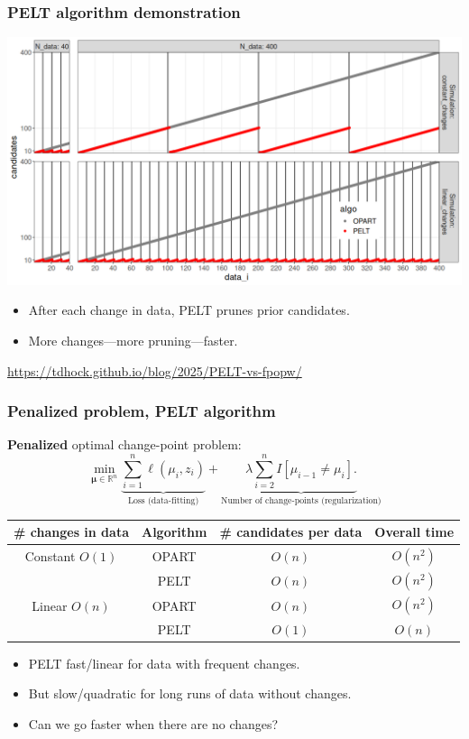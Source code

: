 \documentclass{beamer}
\newcommand{\algo}[1]{\textcolor{#1}{#1}}
\newcommand{\RR}{\mathbb R}
\newcommand{\algo}[1]{\textcolor{#1}{#1}}
\begin{document}
\begin{frame}
  \frametitle{PELT algorithm demonstration}
  \includegraphics[width=\textwidth]{pelt-prune-1.png}

  \begin{itemize}
  \item After each change in data, PELT prunes prior candidates.
  \item More changes---more pruning---faster.
  \end{itemize}
  
  \url{https://tdhock.github.io/blog/2025/PELT-vs-fpopw/}
\end{frame}

\begin{frame}
  \frametitle{Penalized problem, PELT algorithm}
  \textbf{Penalized} optimal change-point problem:
$$
\min_{
  \mathbf \mu\in\RR^{n}
}
\underbrace{\sum_{i=1}^{n} \ell( \mu_i,  z_i)}_{\text{Loss (data-fitting)}} + \underbrace{\lambda\sum_{i=2}^n I[\mu_{i-1}\neq \mu_i].}_{\text{Number of change-points (regularization)}}
$$
\begin{tabular}{cccc}
  \# changes in data & Algorithm & \# candidates per data & Overall time \\
  \hline
  Constant $O(1)$ & \algo{OPART} &  $O(n)$ & $O(n^2)$\\
                     & \algo{PELT} &  $O(n)$ & $O(n^2)$\\
  \hline
  Linear $O(n)$ & \algo{OPART} &  $O(n)$ & $O(n^2)$ \\
   & \algo{PELT} &  \textcolor{PELT}{$O(1)$} & \textcolor{PELT}{$O(n)$} \\
\end{tabular}

\begin{itemize}
\item PELT fast/linear for data with frequent changes.
\item But slow/quadratic for long runs of data without changes.
\item Can we go faster when there are no changes?
\end{itemize}
\end{frame}
\end{document}
